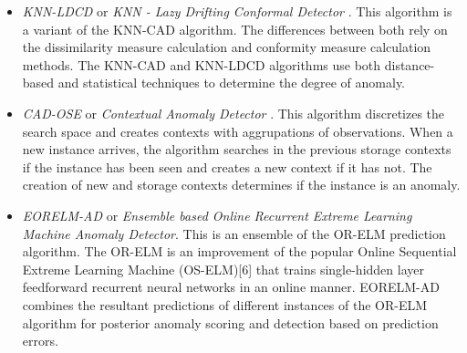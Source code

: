 \documentclass[a4paper]{article}\usepackage[]{graphicx}\usepackage[]{color}
\begin{document}
\begin{itemize}
\item \emph{KNN-LDCD} or \emph{KNN - Lazy Drifting Conformal Detector} \cite{2017arXiv170603412I}. This algorithm is a variant of the KNN-CAD algorithm. The differences between both rely on the dissimilarity measure calculation and conformity measure calculation methods. The KNN-CAD and KNN-LDCD algorithms use both distance-based and statistical techniques to determine the degree of anomaly.

\item \emph{CAD-OSE} or \emph{Contextual Anomaly Detector} \cite{2018-Smirnov-ContextualAnomalyDetector}. This algorithm discretizes the search space and creates contexts with aggrupations of observations. When a new instance arrives, the algorithm searches in the previous storage contexts if the instance has been seen and creates a new context if it has not. The creation of new and storage contexts determines if the instance is an anomaly.

\item \emph{EORELM-AD} or \emph{Ensemble based Online Recurrent Extreme Learning Machine Anomaly Detector}. This is an ensemble of the OR-ELM prediction algorithm. The OR-ELM \cite{Park2017} is an improvement of the popular Online Sequential Extreme Learning Machine (OS-ELM)[6] that trains single-hidden layer feedforward recurrent neural networks in an online manner. EORELM-AD combines the resultant predictions of different instances of the OR-ELM algorithm for posterior anomaly scoring and detection based on prediction errors.

\end{itemize}
\end{document}

